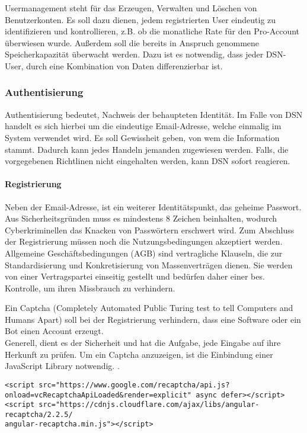 
Usermanagement steht für das Erzeugen, Verwalten und Löschen von Benutzerkonten. Es soll dazu dienen, jedem registrierten User eindeutig zu identifizieren und kontrollieren, z.B. ob die monatliche Rate für den Pro-Account überwiesen wurde. Außerdem soll die bereits in Anspruch genommene Speicherkapazität überwacht werden. Dazu ist es notwendig, dass jeder DSN-User, durch eine Kombination von Daten differenzierbar ist.
\subsubsection{Authentisierung}
Authentisierung bedeutet, Nachweis der behaupteten Identität. Im Falle von DSN handelt es sich hierbei um die eindeutige Email-Adresse, welche einmalig im System verwendet wird. Es soll Gewissheit geben, von wem die Information stammt. Dadurch kann jedes Handeln jemanden zugewiesen werden. Falls, die vorgegebenen Richtlinen nicht eingehalten werden, kann DSN sofort reagieren.
\paragraph{Registrierung}
Neben der Email-Adresse, ist ein weiterer Identitätspunkt, das geheime Passwort. Aus Sicherheitsgründen muss es mindestens 8 Zeichen beinhalten, wodurch Cyberkriminellen das Knacken von Passwörtern erschwert wird. Zum Abschluss der Registrierung müssen noch die Nutzungsbedingungen akzeptiert werden.\\
\grqq{}Allgemeine Geschäftsbedingungen (AGB) sind vertragliche Klauseln, die zur Standardisierung und Konkretisierung von Massenverträgen dienen. Sie werden von einer Vertragspartei einseitig gestellt und bedürfen daher einer bes. Kontrolle, um ihren Missbrauch zu verhindern.\grqq{}\cite{AGB}\\
\cite{VERTEILTE_SYSTEME}\cite{PASSWORT_SCHUTZ}


\newpage

Ein Captcha (Completely Automated Public Turing test to tell Computers and Humans Apart) soll bei der Registrierung verhindern, dass eine Software oder ein Bot einen Account erzeugt.\\
Generell, dient es der Sicherheit und hat die Aufgabe, jede Eingabe auf ihre Herkunft zu prüfen. Um ein Captcha anzuzeigen, ist die Einbindung einer JavaScript Library notwendig. \cite{CAPTCHA}.
\begin{lstlisting}[caption={Einbindung der JS-Library Recaptcha}]
<script src="https://www.google.com/recaptcha/api.js?
onload=vcRecaptchaApiLoaded&render=explicit" async defer></script>
<script src="https://cdnjs.cloudflare.com/ajax/libs/angular-recaptcha/2.2.5/
angular-recaptcha.min.js"></script>
\end{lstlisting}

